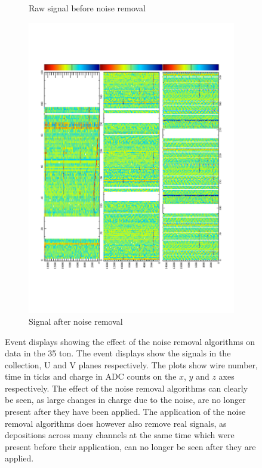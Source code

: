 \begin{figure}
\begin{subfigure}{0.55\textwidth}
    \caption{Raw signal before noise removal}
  \end{subfigure}
  \begin{subfigure}{0.55\textwidth}
    \centering
    \includegraphics[width=\textwidth]{Evd_AfterNoise}
    \caption{Signal after noise removal}
  \end{subfigure}
  \caption[The effect of noise removal algorithms in the 35 ton]
          {Event displays showing the effect of the noise removal algorithms on data in the 35 ton. The event displays show the signals in the collection, U and V planes respectively. The plots show wire number, time in ticks and charge in ADC counts on the $x$, $y$ and $z$ axes respectively. The effect of the noise removal algorithms can clearly be seen, as large changes in charge due to the noise, are no longer present after they have been applied. The application of the noise removal algorithms does however also remove real signals, as depositions across many channels at the same time which were present before their application, can no longer be seen after they are applied.}
  \label{fig:NoiseRemoval}
\end{figure}

